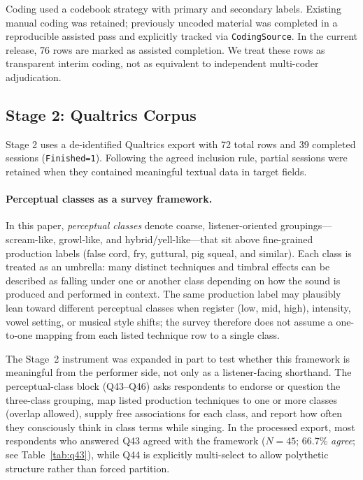 \documentclass{article}
\begin{document}
Coding used a codebook strategy with primary and secondary labels.
Existing manual coding was retained; previously uncoded material was completed in a reproducible assisted pass and explicitly tracked via \texttt{CodingSource}.
In the current release, 76 rows are marked as assisted completion.
We treat these rows as transparent interim coding, not as equivalent to independent multi-coder adjudication.

\subsection{Stage 2: Qualtrics Corpus}
Stage 2 uses a de-identified Qualtrics export with 72 total rows and 39 completed sessions (\texttt{Finished=1}).
Following the agreed inclusion rule, partial sessions were retained when they contained meaningful textual data in target fields.

\paragraph{Perceptual classes as a survey framework.}
In this paper, \emph{perceptual classes} denote coarse, listener-oriented groupings---scream-like, growl-like, and hybrid/yell-like---that sit above fine-grained production labels (false cord, fry, guttural, pig squeal, and similar).
Each class is treated as an umbrella: many distinct techniques and timbral effects can be described as falling under one or another class depending on how the sound is produced and performed in context.
The same production label may plausibly lean toward different perceptual classes when register (low, mid, high), intensity, vowel setting, or musical style shifts; the survey therefore does not assume a one-to-one mapping from each listed technique row to a single class.

The Stage~2 instrument was expanded in part to test whether this framework is meaningful from the performer side, not only as a listener-facing shorthand.
The perceptual-class block (Q43--Q46) asks respondents to endorse or question the three-class grouping, map listed production techniques to one or more classes (overlap allowed), supply free associations for each class, and report how often they consciously think in class terms while singing.
In the processed export, most respondents who answered Q43 agreed with the framework (\(N=45\); 66.7\% \emph{agree}; see Table~\ref{tab:q43}), while Q44 is explicitly multi-select to allow polythetic structure rather than forced partition.
\end{document}
